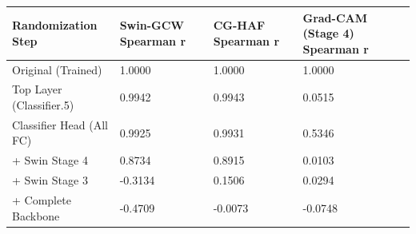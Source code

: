 \begin{tabular}{llll}
\toprule
Randomization Step & Swin-GCW Spearman r & CG-HAF Spearman r & Grad-CAM (Stage 4) Spearman r \\
\midrule
Original (Trained) & 1.0000 & 1.0000 & 1.0000 \\
Top Layer (Classifier.5) & 0.9942 & 0.9943 & 0.0515 \\
Classifier Head (All FC) & 0.9925 & 0.9931 & 0.5346 \\
+ Swin Stage 4 & 0.8734 & 0.8915 & 0.0103 \\
+ Swin Stage 3 & -0.3134 & 0.1506 & 0.0294 \\
+ Complete Backbone & -0.4709 & -0.0073 & -0.0748 \\
\bottomrule
\end{tabular}
